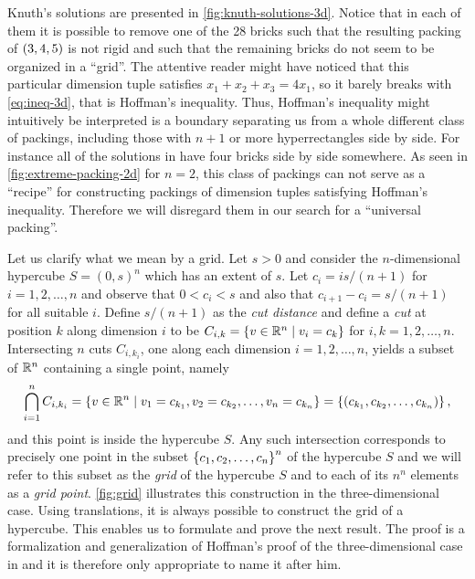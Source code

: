 Knuth's solutions \cite{Knuth_2004} are presented in \cref{fig:knuth-solutions-3d}. Notice that in each of them it is possible to remove one of the 28 bricks such that the resulting packing of $\left( 3, 4, 5 \right)$ is not rigid and such that the remaining bricks do not seem to be organized in a ``grid''. The attentive reader might have noticed that this particular dimension tuple satisfies $x_1 + x_2 + x_3 = 4x_1$, so it barely breaks with \eqref{eq:ineq-3d}, that is Hoffman's inequality. Thus, Hoffman's inequality might intuitively be interpreted is a boundary separating us from a whole different class of packings, including those with $n + 1$ or more hyperrectangles side by side. For instance all of the solutions in \cite{Knuth_2004} have four bricks side by side somewhere. As seen in \cref{fig:extreme-packing-2d} for $n = 2$, this class of packings can not serve as a ``recipe'' for constructing packings of dimension tuples satisfying Hoffman's inequality. Therefore we will disregard them in our search for a ``universal packing''.

Let us clarify what we mean by a grid. Let $s > 0$ and consider the $n$-dimensional hypercube $S = (0, s)^n$ which has an extent of $s$. Let $c_i = is/(n + 1)$ for $i = 1, 2, \dotsc, n$ and observe that $0 < c_i < s$ and also that $c_{i + 1} - c_i = s/(n + 1)$ for all suitable $i$. Define $s/(n + 1)$ as the \textit{cut distance} and define a \textit{cut} at position $k$ along dimension $i$ to be $C_{i, k} = \left\{  v \in \mathbb{R}^n \mid v_i = c_k  \right\}$ for $i, k = 1, 2, \dotsc, n$. Intersecting $n$ cuts $C_{i, k_i}$, one along each dimension $i = 1, 2, \dotsc, n$, yields a subset of $\mathbb{R}^n$ containing a single point, namely
\[
\bigcap_{i = 1}^n C_{i, k_i}
= \left\{  v \in \mathbb{R}^n \mid v_1 = c_{k_1}, v_2 = c_{k_2}, \dotsc, v_n = c_{k_n}  \right\}
= \left\{ \left( c_{k_1}, c_{k_2}, \dotsc, c_{k_n} \right) \right\},
\]
and this point is inside the hypercube $S$. Any such intersection corresponds to precisely one point in the subset $\left\{ c_1, c_2, \dotsc, c_n \right\}^n$ of the hypercube $S$ and we will refer to this subset as the \textit{grid} of the hypercube $S$ and to each of its $n^n$ elements as a \textit{grid point}. \cref{fig:grid} illustrates this construction in the three-dimensional case. Using translations, it is always possible to construct the grid of a hypercube. This enables us to formulate and prove the next result. The proof is a formalization and generalization of Hoffman's proof of the three-dimensional case in \cite[p. 218--219]{Hoffman1981} and it is therefore only appropriate to name it after him.

